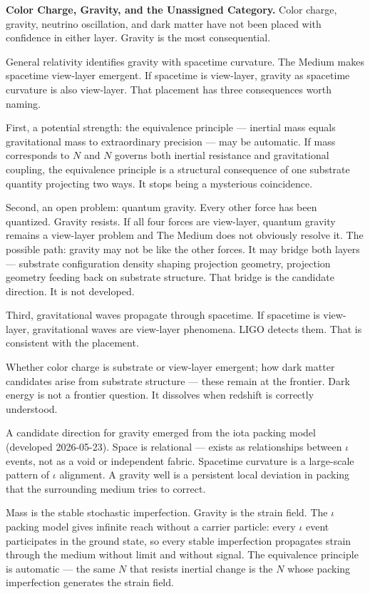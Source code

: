 \documentclass[11pt,letterpaper]{article}
\begin{document}
\textbf{Color Charge, Gravity, and the Unassigned Category.} Color charge, gravity, neutrino oscillation, and dark matter have not been placed with confidence in either layer. Gravity is the most consequential.

General relativity identifies gravity with spacetime curvature. The Medium makes spacetime view-layer emergent. If spacetime is view-layer, gravity as spacetime curvature is also view-layer. That placement has three consequences worth naming.

First, a potential strength: the equivalence principle --- inertial mass equals gravitational mass to extraordinary precision --- may be automatic. If mass corresponds to \(N\) and \(N\) governs both inertial resistance and gravitational coupling, the equivalence principle is a structural consequence of one substrate quantity projecting two ways. It stops being a mysterious coincidence.

Second, an open problem: quantum gravity. Every other force has been quantized. Gravity resists. If all four forces are view-layer, quantum gravity remains a view-layer problem and The Medium does not obviously resolve it. The possible path: gravity may not be like the other forces. It may bridge both layers --- substrate configuration density shaping projection geometry, projection geometry feeding back on substrate structure. That bridge is the candidate direction. It is not developed.

Third, gravitational waves propagate through spacetime. If spacetime is view-layer, gravitational waves are view-layer phenomena. LIGO detects them. That is consistent with the placement.

Whether color charge is substrate or view-layer emergent; how dark matter candidates arise from substrate structure --- these remain at the frontier. Dark energy is not a frontier question. It dissolves when redshift is correctly understood.

A candidate direction for gravity emerged from the iota packing model (developed 2026-05-23). Space is relational --- exists as relationships between \(\iota\) events, not as a void or independent fabric. Spacetime curvature is a large-scale pattern of \(\iota\) alignment. A gravity well is a persistent local deviation in packing that the surrounding medium tries to correct.

Mass is the stable stochastic imperfection. Gravity is the strain field. The \(\iota\) packing model gives infinite reach without a carrier particle: every \(\iota\) event participates in the ground state, so every stable imperfection propagates strain through the medium without limit and without signal. The equivalence principle is automatic --- the same \(N\) that resists inertial change is the \(N\) whose packing imperfection generates the strain field.
\end{document}
